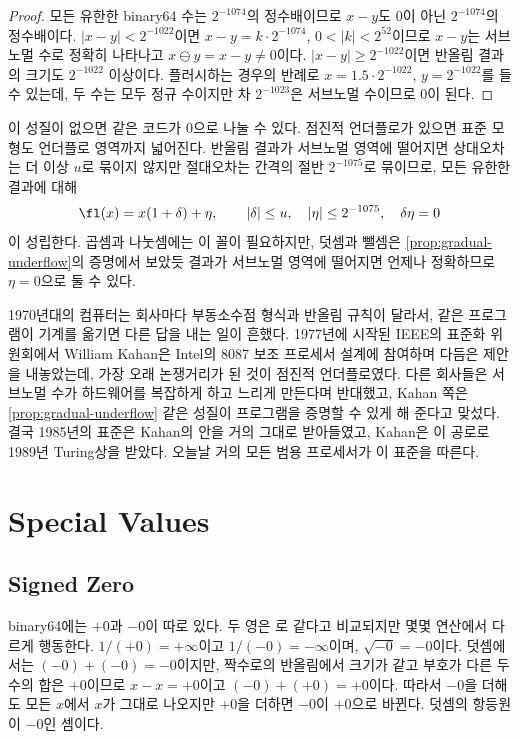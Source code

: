 \begin{proof}
모든 유한한 binary64 수는 $2^{-1074}$의 정수배이므로 $x-y$도 $0$이 아닌 $2^{-1074}$의 정수배이다. $|x-y|<2^{-1022}$이면 $x-y=k\cdot2^{-1074}$, $0<|k|<2^{52}$이므로 $x-y$는 서브노멀 수로 정확히 나타나고 $x\ominus y=x-y\ne0$이다. $|x-y|\ge2^{-1022}$이면 반올림 결과의 크기도 $2^{-1022}$ 이상이다. 플러시하는 경우의 반례로 $x=1.5\cdot2^{-1022}$, $y=2^{-1022}$를 들 수 있는데, 두 수는 모두 정규 수이지만 차 $2^{-1023}$은 서브노멀 수이므로 $0$이 된다.
\end{proof}

이 성질이 없으면  같은 코드가 $0$으로 나눌 수 있다. 점진적 언더플로가 있으면 표준 모형도 언더플로 영역까지 넓어진다. 반올림 결과가 서브노멀 영역에 떨어지면 상대오차는 더 이상 $u$로 묶이지 않지만 절대오차는 간격의 절반 $2^{-1075}$로 묶이므로, 모든 유한한 결과에 대해
\[
\fl(x)=x(1+\delta)+\eta,\qquad|\delta|\le u,\quad|\eta|\le2^{-1075},\quad\delta\eta=0
\]
이 성립한다. 곱셈과 나눗셈에는 이 꼴이 필요하지만, 덧셈과 뺄셈은 \cref{prop:gradual-underflow}의 증명에서 보았듯 결과가 서브노멀 영역에 떨어지면 언제나 정확하므로 $\eta=0$으로 둘 수 있다.

\begin{aside}
1970년대의 컴퓨터는 회사마다 부동소수점 형식과 반올림 규칙이 달라서, 같은 프로그램이 기계를 옮기면 다른 답을 내는 일이 흔했다. 1977년에 시작된 IEEE의 표준화 위원회에서 William Kahan은 Intel의 8087 보조 프로세서 설계에 참여하며 다듬은 제안을 내놓았는데, 가장 오래 논쟁거리가 된 것이 점진적 언더플로였다. 다른 회사들은 서브노멀 수가 하드웨어를 복잡하게 하고 느리게 만든다며 반대했고, Kahan 쪽은 \cref{prop:gradual-underflow} 같은 성질이 프로그램을 증명할 수 있게 해 준다고 맞섰다\cite{coonen1981underflow}. 결국 1985년의 표준은 Kahan의 안을 거의 그대로 받아들였고, Kahan은 이 공로로 1989년 Turing상을 받았다\cite{severance1998}. 오늘날 거의 모든 범용 프로세서가 이 표준을 따른다.
\end{aside}

\section{Special Values}
\label{sec:special-values}

\subsection{Signed Zero}

binary64에는 $+0$과 $-0$이 따로 있다. 두 영은 \code{==}로 같다고 비교되지만 몇몇 연산에서 다르게 행동한다. $1/(+0)=+\infty$이고 $1/(-0)=-\infty$이며, $\sqrt{-0}=-0$이다. 덧셈에서는 $(-0)+(-0)=-0$이지만, 짝수로의 반올림에서 크기가 같고 부호가 다른 두 수의 합은 $+0$이므로 $x-x=+0$이고 $(-0)+(+0)=+0$이다. 따라서 $-0$을 더해도 모든 $x$에서 $x$가 그대로 나오지만 $+0$을 더하면 $-0$이 $+0$으로 바뀐다. 덧셈의 항등원이 $-0$인 셈이다.

